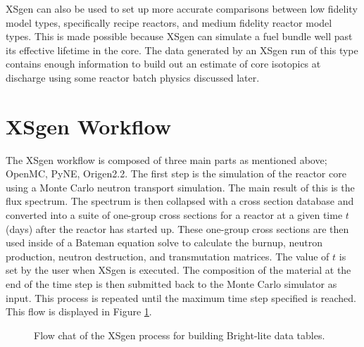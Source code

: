 \documentclass{article}
\begin{document}
XSgen can also be used to set up more accurate comparisons between low fidelity model types, specifically recipe reactors, and medium fidelity reactor model types. This is made possible because XSgen can simulate a fuel bundle well past its effective lifetime in the core. The data generated by an XSgen run of this type contains enough information to build out an estimate of core isotopics at discharge using some reactor batch physics discussed later.

\section{XSgen Workflow}
The XSgen workflow is composed of three main parts as mentioned above; OpenMC, PyNE, Origen2.2. The first step is the simulation of the reactor core using a Monte Carlo neutron transport simulation. The main result of this is the flux spectrum. The spectrum is then collapsed with a cross section database and converted into a suite of one-group cross sections for a reactor at a given time $t$ (days) after the reactor has started up. These one-group cross sections are then used inside of
a Bateman equation solve to calculate the burnup, neutron production, neutron destruction,
and transmutation matrices. The value of $t$ is set by the user when XSgen is executed.
The composition of the material at the end of the time step is then submitted back to
the Monte Carlo simulator as input. This process is repeated until the maximum time
step specified is reached. This flow is displayed in Figure \ref{fig:flow}.

\begin{figure}\center{}
\caption{Flow chat of the XSgen process for building Bright-lite data tables.}
\label{fig:flow}
\end{figure}
\end{document}
